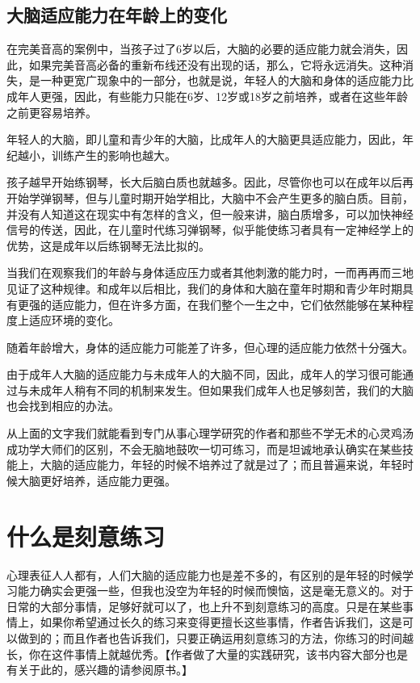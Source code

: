 \documentclass[12pt,oneside]{book}
\begin{document}
\subsection{大脑适应能力在年龄上的变化}
\begin{bookref}[frametitle={\cite{刻意练习}}]
在完美音高的案例中，当孩子过了6岁以后，大脑的必要的适应能力就会消失，因此，如果完美音高必备的重新布线还没有出现的话，那么，它将永远消失。这种消失，是一种更宽广现象中的一部分，也就是说，年轻人的大脑和身体的适应能力比成年人更强，因此，有些能力只能在6岁、12岁或18岁之前培养，或者在这些年龄之前更容易培养。

年轻人的大脑，即儿童和青少年的大脑，比成年人的大脑更具适应能力，因此，年纪越小，训练产生的影响也越大。

孩子越早开始练钢琴，长大后脑白质也就越多。因此，尽管你也可以在成年以后再开始学弹钢琴，但与儿童时期开始学相比，大脑中不会产生更多的脑白质。目前，并没有人知道这在现实中有怎样的含义，但一般来讲，脑白质增多，可以加快神经信号的传送，因此，在儿童时代练习弹钢琴，似乎能使练习者具有一定神经学上的优势，这是成年以后练钢琴无法比拟的。

当我们在观察我们的年龄与身体适应压力或者其他刺激的能力时，一而再再而三地见证了这种规律。和成年以后相比，我们的身体和大脑在童年时期和青少年时期具有更强的适应能力，但在许多方面，在我们整个一生之中，它们依然能够在某种程度上适应环境的变化。

随着年龄增大，身体的适应能力可能差了许多，但心理的适应能力依然十分强大。

由于成年人大脑的适应能力与未成年人的大脑不同，因此，成年人的学习很可能通过与未成年人稍有不同的机制来发生。但如果我们成年人也足够刻苦，我们的大脑也会找到相应的办法。
\end{bookref}

从上面的文字我们就能看到专门从事心理学研究的作者和那些不学无术的心灵鸡汤成功学大师们的区别，不会无脑地鼓吹一切可练习，而是坦诚地承认确实在某些技能上，大脑的适应能力，年轻的时候不培养过了就是过了；而且普遍来说，年轻时候大脑更好培养，适应能力更强。


\section{什么是刻意练习}
心理表征人人都有，人们大脑的适应能力也是差不多的，有区别的是年轻的时候学习能力确实会更强一些，但我也没空为年轻的时候而懊恼，这是毫无意义的。对于日常的大部分事情，足够好就可以了，也上升不到刻意练习的高度。只是在某些事情上，如果你希望通过长久的练习来变得更擅长这些事情，作者告诉我们，这是可以做到的；而且作者也告诉我们，只要正确运用刻意练习的方法，你练习的时间越长，你在这件事情上就越优秀。【作者做了大量的实践研究，该书内容大部分也是有关于此的，感兴趣的请参阅原书。】
\end{document}
